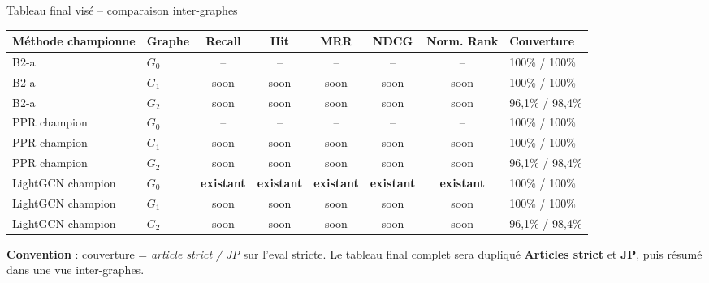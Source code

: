 \documentclass[aspectratio=169,10pt]{beamer}
\begin{document}
\begin{frame}{Tableau final visé -- comparaison inter-graphes}
  \scriptsize
  \begin{center}
  \renewcommand{\arraystretch}{1.12}
  \setlength{\tabcolsep}{3.5pt}
  \begin{tabular}{@{}p{2.7cm} p{0.9cm} c c c c c p{1.9cm}@{}}
    \toprule
    \textbf{Méthode championne} & \textbf{Graphe} & \textbf{Recall} & \textbf{Hit} & \textbf{MRR} & \textbf{NDCG} & \textbf{Norm. Rank} & \textbf{Couverture} \\
    \midrule
    B2-a & $G_0$ & -- & -- & -- & -- & -- & 100\% / 100\% \\
    B2-a & $G_1$ & soon & soon & soon & soon & soon & 100\% / 100\% \\
    B2-a & $G_2$ & soon & soon & soon & soon & soon & 96,1\% / 98,4\% \\
    \midrule
    PPR champion & $G_0$ & -- & -- & -- & -- & -- & 100\% / 100\% \\
    PPR champion & $G_1$ & soon & soon & soon & soon & soon & 100\% / 100\% \\
    PPR champion & $G_2$ & soon & soon & soon & soon & soon & 96,1\% / 98,4\% \\
    \midrule
    LightGCN champion & $G_0$ & \textbf{existant} & \textbf{existant} & \textbf{existant} & \textbf{existant} & \textbf{existant} & 100\% / 100\% \\
    LightGCN champion & $G_1$ & soon & soon & soon & soon & soon & 100\% / 100\% \\
    LightGCN champion & $G_2$ & soon & soon & soon & soon & soon & 96,1\% / 98,4\% \\
    \bottomrule
  \end{tabular}
  \end{center}

  \vspace{0.35em}
  {\scriptsize
  \textbf{Convention} : couverture = \textit{article strict / JP} sur l'eval stricte.
  Le tableau final complet sera dupliqué \textbf{Articles strict} et \textbf{JP},
  puis résumé dans une vue inter-graphes.}
\end{frame}
\end{document}
